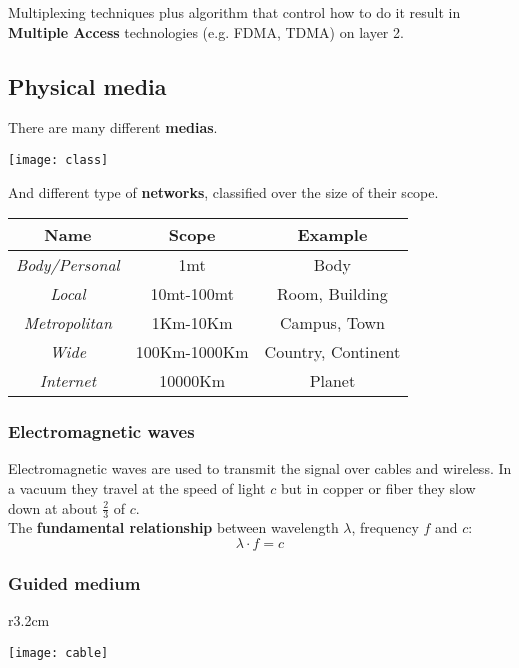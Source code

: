 \begin{note}
	Multiplexing techniques plus algorithm that control how to do it result in \textbf{Multiple Access} technologies (e.g. FDMA, TDMA) on layer 2.
\end{note}

\newpage
\subsection{Physical media}
There are many different \textbf{medias}.
\begin{center}
	\texttt{[image: class]}
\end{center}
And different type of \textbf{networks}, classified over the size of their scope.
\begin{table}[!h]
	\centering
	\begin{tabular}{|c|c|c|}
		\hline
		\textbf{Name} & \textbf{Scope} & \textbf{Example} \\
		\hline
		\textit{Body/Personal} & 1mt & Body \\
		\hline
		\textit{Local} & 10mt-100mt & Room, Building \\
		\hline
		\textit{Metropolitan} & 1Km-10Km & Campus, Town \\
		\hline
		\textit{Wide} & 100Km-1000Km & Country, Continent \\
		\hline
		\textit{Internet} & 10000Km & Planet \\
		\hline
	\end{tabular}
\end{table}
\subsubsection{Electromagnetic waves}
Electromagnetic waves are used to transmit the signal over cables and wireless. In a vacuum they travel at the speed of light $c$ but in copper or fiber they slow down at about $\frac{2}{3}$ of $c$.\\
The \textbf{fundamental relationship} between wavelength $\lambda$, frequency $f$ and $c$:
\begin{equation}
	\lambda \cdot f = c
\end{equation}

\subsubsection{Guided medium}
\begin{wrapfigure}[7]{r}{3.2cm}
	\vspace{-1cm}
	\begin{center}
		\texttt{[image: cable]}
	\end{center}
\end{wrapfigure}
